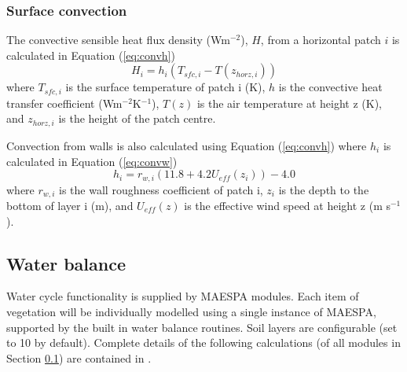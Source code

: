 \documentclass[preprint,12pt,authoryear]{elsarticle}
\begin{document}
\subsubsection{Surface convection}

The convective sensible heat flux density (Wm$^{-2}$), $H$, from a horizontal patch $i$ is calculated in Equation (\ref{eq:convh})
\begin{equation} 
H_{i} = h_{i} (T_{sfc,i}-T(z_{horz,i}))
\label{eq:convh} \end{equation} 
where $T_{sfc,i}$ is the surface temperature of patch i (K),
$h$ is the convective heat transfer coefficient (Wm$^{-2}$K$^{-1}$), 
$T(z)$ is the air temperature at height z (K), and 
$z_{horz,i}$ is the height of the patch centre.

Convection from walls is also calculated using Equation (\ref{eq:convh}) where $h_{i}$ is calculated in Equation (\ref{eq:convw})
\begin{equation} 
h_{i} = r_{w,i}(11.8+4.2 U_{eff}(z_{i}))-4.0
\label{eq:convw} \end{equation} 
where 
$r_{w,i}$ is the wall roughness coefficient of patch i,
$z_{i}$ is the depth to the bottom of layer i (m), and
$U_{eff}(z)$ is the effective wind speed at height z (m s$^{-1}$).


\subsection{Water balance}\label{sec:waterbalance}
Water cycle functionality is supplied by MAESPA modules. Each item of vegetation will be individually modelled using a single instance of MAESPA, supported by the built in water balance routines. Soil layers are configurable (set to 10 by default). Complete details of the following calculations (of all modules in Section \ref{sec:waterbalance}) are contained in \cite{Duursma2012}.

%
%
\end{document}
